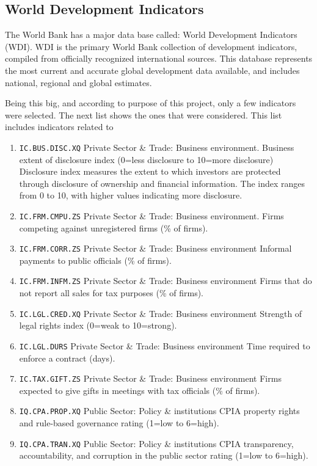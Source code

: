 \subsection{World Development Indicators}

The World Bank has a major data base called: World Development Indicators (WDI). WDI is the primary World Bank collection of development indicators, compiled from officially recognized international sources. This database represents the most current and accurate global development data available, and includes national, regional and global estimates.

Being this big, and according to purpose of this project, only a few indicators were selected. The next list shows the ones that were considered. This list includes indicators related to 

\begin{enumerate}[1.]
\item \texttt{IC.BUS.DISC.XQ}	Private Sector \& Trade: Business environment. Business extent of disclosure index (0=less disclosure to 10=more disclosure)	Disclosure index measures the extent to which investors are protected through disclosure of ownership and financial information. The index ranges from 0 to 10, with higher values indicating more disclosure.
\item \texttt{IC.FRM.CMPU.ZS}	Private Sector \& Trade: Business environment. Firms competing against unregistered firms (\% of firms).
\item \texttt{IC.FRM.CORR.ZS}	Private Sector \& Trade: Business environment	Informal payments to public officials (\% of firms).
\item \texttt{IC.FRM.INFM.ZS}	Private Sector \& Trade: Business environment	Firms that do not report all sales for tax purposes (\% of firms).
\item \texttt{IC.LGL.CRED.XQ}	Private Sector \& Trade: Business environment	Strength of legal rights index (0=weak to 10=strong).
\item \texttt{IC.LGL.DURS}	Private Sector \& Trade: Business environment	Time required to enforce a contract (days).
\item \texttt{IC.TAX.GIFT.ZS}	Private Sector \& Trade: Business environment	Firms expected to give gifts in meetings with tax officials (\% of firms).
\item \texttt{IQ.CPA.PROP.XQ}	Public Sector: Policy \& institutions	CPIA property rights and rule-based governance rating (1=low to 6=high).
\item \texttt{IQ.CPA.TRAN.XQ}	Public Sector: Policy \& institutions	CPIA transparency, accountability, and corruption in the public sector rating (1=low to 6=high).

\end{enumerate}
